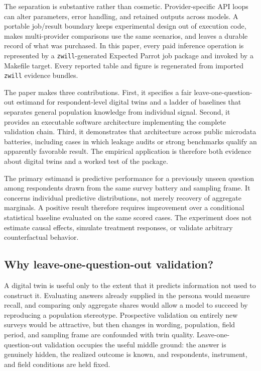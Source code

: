 \documentclass[11pt]{article}
\newcommand{\zwill}{\texttt{zwill}}
\begin{document}
The separation is substantive rather than cosmetic. Provider-specific API
loops can alter parameters, error handling, and retained outputs across models.
A portable job/result boundary keeps experimental design out of execution code,
makes multi-provider comparisons use the same scenarios, and leaves a durable
record of what was purchased. In this paper, every paid inference operation is
represented by a \zwill-generated Expected Parrot job package and invoked by a
Makefile target. Every reported table and figure is regenerated from imported
\zwill{} evidence bundles.

The paper makes three contributions. First, it specifies a fair
leave-one-question-out estimand for respondent-level digital twins and a ladder
of baselines that separates general population knowledge from individual
signal. Second, it provides an executable software architecture implementing
the complete validation chain. Third, it demonstrates that architecture across
public microdata batteries, including cases in which leakage audits or strong
benchmarks qualify an apparently favorable result. The empirical application
is therefore both evidence about digital twins and a worked test of the package.

The primary estimand is predictive performance for a previously unseen
question among respondents drawn from the same survey battery and sampling
frame. It concerns individual predictive distributions, not merely recovery of
aggregate marginals. A positive result therefore requires improvement over a
conditional statistical baseline evaluated on the same scored cases. The
experiment does not estimate causal effects, simulate treatment responses, or
validate arbitrary counterfactual behavior.

\subsection{Why leave-one-question-out validation?}
A digital twin is useful only to the extent that it predicts information not
used to construct it. Evaluating answers already supplied in the persona would
measure recall, and comparing only aggregate shares would allow a model to
succeed by reproducing a population stereotype. Prospective validation on
entirely new surveys would be attractive, but then changes in wording,
population, field period, and sampling frame are confounded with twin quality.
Leave-one-question-out validation occupies the useful middle ground: the
answer is genuinely hidden, the realized outcome is known, and respondents,
instrument, and field conditions are held fixed.
\end{document}

